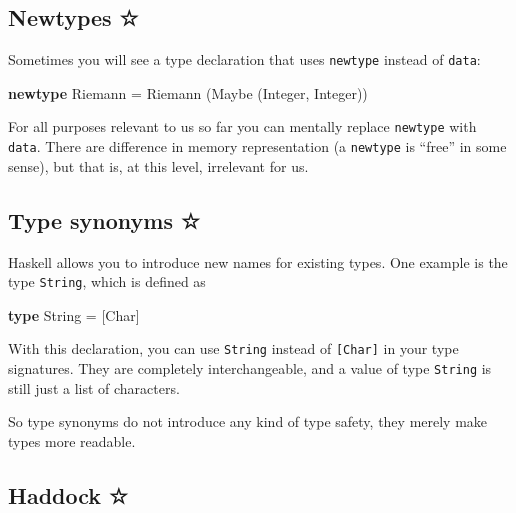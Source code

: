 \documentclass[11pt,
  american,
  DIV13]{article}
\newenvironment{Shaded}{}{}
\newcommand{\DataTypeTok}[1]{\textcolor[rgb]{0.56,0.13,0.00}{#1}}
\newcommand{\KeywordTok}[1]{\textcolor[rgb]{0.00,0.44,0.13}{\textbf{#1}}}
\newcommand{\NormalTok}[1]{#1}
\newcommand{\OtherTok}[1]{\textcolor[rgb]{0.00,0.44,0.13}{#1}}
\begin{document}
\hypertarget{newtypes}{%
\subsection{Newtypes ☆}\label{newtypes}}

Sometimes you will see a type declaration that uses \texttt{newtype}
instead of \texttt{data}:

\begin{Shaded}
\begin{Highlighting}[]
\KeywordTok{newtype} \DataTypeTok{Riemann} \OtherTok{=} \DataTypeTok{Riemann}\NormalTok{ (}\DataTypeTok{Maybe}\NormalTok{ (}\DataTypeTok{Integer}\NormalTok{, }\DataTypeTok{Integer}\NormalTok{))}
\end{Highlighting}
\end{Shaded}

For all purposes relevant to us so far you can mentally replace
\texttt{newtype} with \texttt{data}. There are difference in memory
representation (a \texttt{newtype} is ``free'' in some sense), but that
is, at this level, irrelevant for us.

\hypertarget{type-synonyms}{%
\subsection{Type synonyms ☆}\label{type-synonyms}}

Haskell allows you to introduce new names for existing types. One
example is the type \texttt{String}, which is defined as

\begin{Shaded}
\begin{Highlighting}[]
\KeywordTok{type} \DataTypeTok{String} \OtherTok{=}\NormalTok{ [}\DataTypeTok{Char}\NormalTok{]}
\end{Highlighting}
\end{Shaded}

With this declaration, you can use \texttt{String} instead of
\texttt{{[}Char{]}} in your type signatures. They are completely
interchangeable, and a value of type \texttt{String} is still just a
list of characters.

So type synonyms do not introduce any kind of type safety, they merely
make types more readable.

\hypertarget{haddock}{%
\subsection{Haddock ☆}\label{haddock}}
\end{document}
